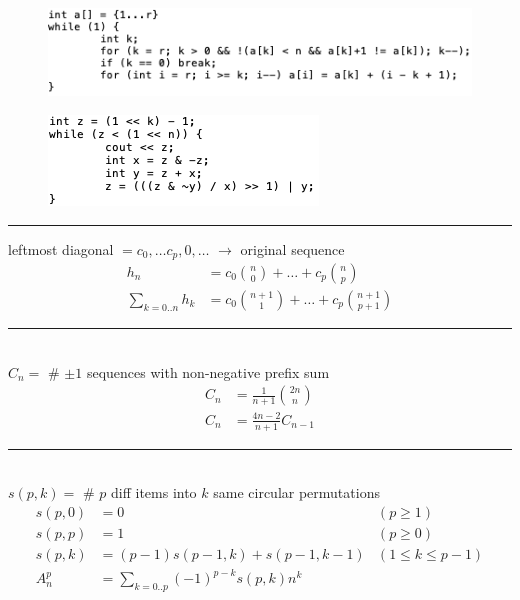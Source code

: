 \documentclass[10pt,letterpaper,landscape]{article}
\begin{document}
\begin{multicols}{2}
\begin{figure}[h] \includegraphics[scale=0.5]{a.png} \end{figure}

\begin{figure}[h] \includegraphics[scale=0.5]{b.png} \end{figure}

\noindent\rule{\linewidth}{1pt}

 leftmost diagonal $= c_0, \hdots c_p, 0, \hdots $ $\rightarrow$ original sequence
\begin{align*}
	h_n &= c_0 \binom{n}{0} + \hdots + c_p \binom{n}{p} \\
	\sum_{k = 0..n}{h_k} &= c_0 \binom{n+1}{1} + \hdots + c_p \binom{n+1}{p+1}
\end{align*}

\noindent\rule{\linewidth}{1pt}

 \\ $C_n =$ \# $\pm 1$ sequences with non-negative prefix sum
\begin{align*}
	C_n &= \frac{1}{n+1} \binom{2n}{n} \\
	C_n &= \frac{4n-2}{n+1} C_{n-1}
\end{align*}

\noindent\rule{\linewidth}{1pt}

 \\ $s(p,k) =$ \# $p$ diff items into $k$ same circular permutations
\begin{align*}
	s(p,0) &= 0 & (p \ge 1) \\
	s(p,p) &= 1 & (p \ge 0) \\
	s(p,k) &= (p-1) s(p-1,k) + s(p-1,k-1) & (1 \le k \le p-1) \\
	A_n^p &= \sum_{k = 0..p}{(-1)^{p-k} s(p,k) n^k}
\end{align*}


\end{multicols}
\end{document}
